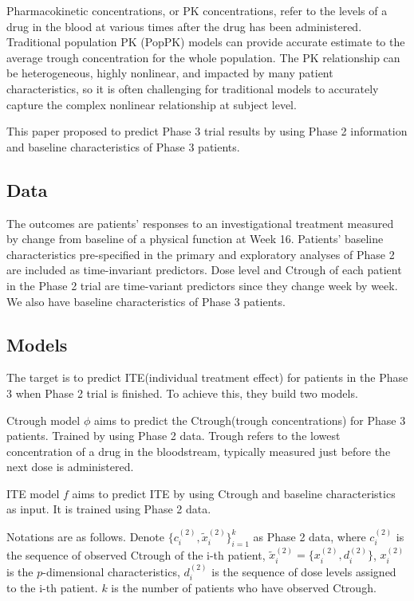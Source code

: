 \documentclass[12pt]{article}
\begin{document}
Pharmacokinetic concentrations, or PK concentrations, refer to the
levels of a drug in the blood at various times after the drug has been
administered. Traditional population PK (PopPK) models can provide
accurate estimate to the average trough concentration for the whole
population. The PK relationship can be heterogeneous, highly
nonlinear, and impacted by many patient characteristics, so it is
often challenging for traditional models to accurately capture the
complex nonlinear relationship at subject level.

This paper proposed to predict Phase 3 trial results by using Phase 2
information and baseline characteristics of Phase 3
patients. 

\subsection{Data}

The outcomes are patients’ responses to an investigational treatment
measured by change from baseline of a physical function at Week
16. Patients’ baseline characteristics pre-speciﬁed in the primary and
exploratory analyses of Phase 2 are included as time-invariant
predictors. Dose level and Ctrough of each patient in the Phase 2
trial are time-variant predictors since they change week by week. We
also have baseline characteristics of Phase 3 patients.

\subsection{Models}

The target is to predict ITE(individual treatment effect) for patients 
in the Phase 3 when Phase 2 trial is finished. To achieve this, they 
build two models.

Ctrough model $\phi$ aims to predict the Ctrough(trough 
concentrations) for Phase 3
patients. Trained by using Phase 2 data. Trough refers to the lowest
concentration of a drug in the bloodstream, typically measured just
before the next dose is administered.

ITE model $f$ aims to predict ITE by using Ctrough and baseline
characteristics as input. It is trained using Phase 2 data.

Notations are as follows. Denote $\{c^{(2)}_i,
\tilde{x}^{(2)}_i\}_{i=1}^{k}$ as Phase 2 data, where $c^{(2)}_i$ is
the sequence of observed Ctrough of the i-th patient,
$\tilde{x}^{(2)}_i=\{x^{(2)}_i, d^{(2)}_i\}$, $x^{(2)}_i$ is the
$p$-dimensional characteristics, $d^{(2)}_i$ is the sequence of dose
levels assigned to the i-th patient. $k$ is the number of patients who
have observed Ctrough.
\end{document}
